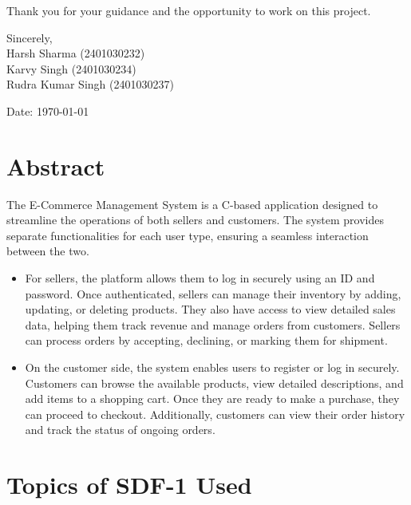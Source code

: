 \documentclass[12pt,a4paper]{article}
\begin{document}
\vspace{1em}

\noindent
Thank you for your guidance and the opportunity to work on this project.

\vspace{2em}

\noindent
Sincerely, \\[2em]

\noindent
Harsh Sharma (2401030232)\\
Karvy Singh (2401030234)\\
Rudra Kumar Singh (2401030237)

\vspace{2cm}

\noindent
Date: \today

\newpage

\tableofcontents

\newpage
\section{Abstract}

The E-Commerce Management System is a C-based application designed to streamline the operations of both sellers and customers. The system provides separate functionalities for each user type, ensuring a seamless interaction between the two.
\begin{itemize}
    \item For sellers, the platform allows them to log in securely using an ID and password. Once authenticated, sellers can manage their inventory by adding, updating, or deleting products. They also have access to view detailed sales data, helping them track revenue and manage orders from customers. Sellers can process orders by accepting, declining, or marking them for shipment.
    \item On the customer side, the system enables users to register or log in securely. Customers can browse the available products, view detailed descriptions, and add items to a shopping cart. Once they are ready to make a purchase, they can proceed to checkout. Additionally, customers can view their order history and track the status of ongoing orders.
    
\end{itemize}

\newpage
\section{Topics of SDF-1 Used}
\end{document}

